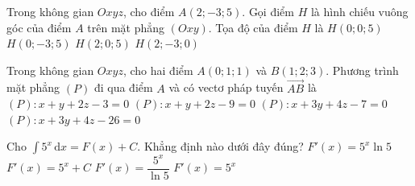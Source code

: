 \begin{ex}%
	Trong không gian $Oxyz$, cho điểm $A\left(2;-3;5\right)$. Gọi điểm $H$ là hình chiếu vuông góc của điểm $A$ trên mặt phẳng $\left(Oxy\right)$. Tọa độ của điểm $H$ là
	\choice
	{$H\left(0;0;5\right)$}
	{$H\left(0;-3;5\right)$}
	{$H\left(2;0;5\right)$}
	{\True $H\left(2;-3;0\right)$}
\end{ex}
\begin{ex}%
	Trong không gian $Oxyz$, cho hai điểm $A\left(0;1;1\right)$ và $B\left(1;2;3\right)$. Phương trình mặt phẳng $\left(P\right)$ đi qua điểm $A$ và có vectơ pháp tuyến $\overrightarrow{AB}$ là
	\choice
	{\True $\left(P\right)\colon x+y+2z-3=0$}
	{$\left(P\right)\colon x+y+2z-9=0$}
	{$\left(P\right)\colon x+3y+4z-7=0$}
	{$\left(P\right)\colon x+3y+4z-26=0$}
\end{ex}
\begin{ex}%
	Cho $\displaystyle\int 5^x\mathrm{\,d}x=F(x)+C$. Khẳng định nào dưới đây đúng?
	\choice
	{$F'(x)=5^x\ln 5$}
	{$F'(x)=5^x+C$}
	{$F'(x)=\dfrac{5^x}{\ln 5}$}
	{\True $F'(x) = 5^x$}
\end{ex}
